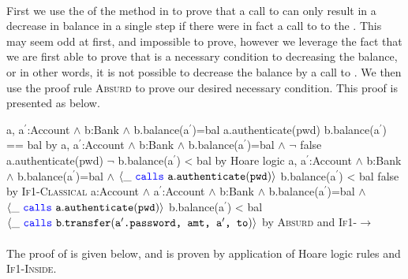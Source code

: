 \paragraph{\emph{\textbf{}}}
First we use the \funcSpec of the  method in  to prove that a call to  can only result in a decrease in balance in a single step if there were in fact a call to  to the . 
This may seem 
odd at first, and impossible to prove, however we leverage the fact that we are first able to prove that 
is a necessary condition to decreasing the balance, or in other words, it is not possible to decrease the balance by a
call to . 
We then use the proof rule \textsc{Absurd} to prove our desired necessary condition.
This proof is presented as  below.
\\
\noindent
{
	\begin{proofexample}
			{\proofstepwithrule
				{\hoareEx
						{a, a$^\prime$:Account $\wedge$ b:Bank $\wedge$ b.balance(a$^\prime$)=bal}
						{a.authenticate(pwd)}
						{b.balance(a$^\prime$) == bal}
						}
					{by \funcSpecs}
			}
			{\proofstepwithrule
				{\hoareEx
						{a, a$^\prime$:Account $\wedge$ b:Bank $\wedge$ b.balance(a$^\prime$)=bal $\wedge$ $\neg$ false}
						{a.authenticate(pwd)}
						{$\neg$ b.balance(a$^\prime$) < bal}
						}
					{by Hoare logic}
			}
			{\proofstepwithrule
				{\onlyIfSingleExAlt
						{a, a$^\prime$:Account $\wedge$ b:Bank $\wedge$ b.balance(a$^\prime$)=bal $\wedge$ $\langle \_\ {\color{blue}\texttt{calls}}\ {\texttt{a}}.{\texttt{authenticate}}({\texttt{pwd}}) \rangle$}
						{b.balance(a$^\prime$) < bal}
						{false}
						}
					{by \textsc{If1-Classical}}
			}
			{\proofstepwithrule
				{\onlyIfSingleExAlt
						{a:Account $\wedge$ a$^\prime$:Account $\wedge$ b:Bank $\wedge$ b.balance(a$^\prime$)=bal $\wedge$ $\langle \_\ {\color{blue}\texttt{calls}}\ {\texttt{a}}.{\texttt{authenticate}}({\texttt{pwd}}) \rangle$}
						{b.balance(a$^\prime$) < bal}
						{$\langle \_\ {\color{blue}\texttt{calls}}\ {\texttt{b}}.{\texttt{transfer}}({\texttt{a$^\prime$.password, amt, a$^\prime$, to}}) \rangle$}
						}
					{by \textsc{Absurd} and \textsc{If1-}$\longrightarrow$}
			}
		\endproofsteps
	\end{proofexample}
}

\paragraph{\emph{\textbf{}}} The proof of  is given below, and is proven by application of Hoare logic rules and \textsc{If1-Inside}.

